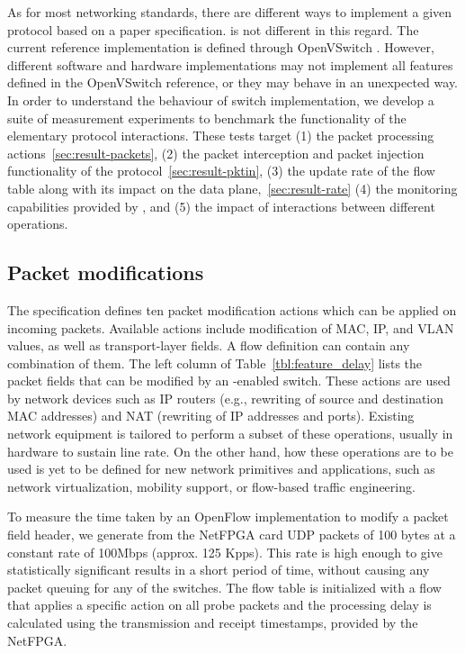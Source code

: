 As for most networking standards, there are different ways to implement a
given protocol based on a paper specification. \of is not different in this
regard. The current reference implementation is defined through OpenVSwitch
\cite{openvswitch}. However, different software and hardware implementations may
not implement all features defined in the OpenVSwitch reference, or they may
behave in an unexpected way. In order to understand the behaviour of switch \of
implementation, we develop a suite of measurement experiments to
benchmark the functionality of the elementary protocol interactions.  These
tests target (1) the \of packet processing actions~\ref{sec:result-packets}, (2)
the packet interception and packet injection functionality of the
protocol~\ref{sec:result-pktin}, (3) the update rate of the \of flow table along
with its impact on the data plane,~\ref{sec:result-rate} (4) the monitoring
capabilities provided by \of, and (5) the impact of interactions between
different \of operations.


\subsection{Packet modifications}\label{sec:results-packets}

The \of specification \cite{openflow-spec} defines ten packet
modification actions which can be applied on incoming
packets. Available actions include modification of MAC, IP, and VLAN
values, as well as transport-layer fields. A flow definition can
contain any combination of them. The left column of
Table~\ref{tbl:feature_delay} lists the packet fields that can be
modified by an \of-enabled switch.
These actions are used by network devices such as IP routers (e.g.,
rewriting of source and destination MAC addresses) and NAT (rewriting
of IP addresses and ports). Existing network equipment is tailored to
perform a subset of these operations, usually in hardware to sustain
line rate. On the other hand, how these operations are to be used is
yet to be defined for new network primitives and applications, such as
network virtualization, mobility support, or flow-based traffic
engineering.

To measure the time taken by an OpenFlow implementation to modify a
packet field header, we generate from the NetFPGA card UDP packets of
100 bytes at a constant rate of 100Mbps (approx. 125 Kpps). 
This rate is high enough to give statistically significant results in
a short period of time, without causing any packet queuing for any of the
switches.  The flow table is initialized with a flow that
applies a specific action on all probe packets and the processing
delay is calculated using the transmission and receipt timestamps,
provided by the NetFPGA.


